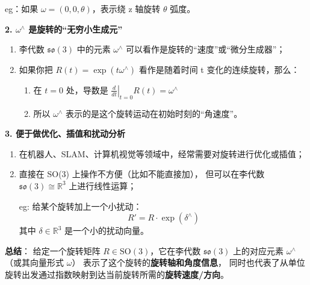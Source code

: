 \documentclass{article}
\begin{document}
eg：如果 $ \omega = (0, 0, \theta) $，表示绕 z 轴旋转 $ \theta $ 弧度。

\textbf{2. $\omega^\wedge$ 是旋转的“无穷小生成元”}
\begin{enumerate}
\item 李代数 $ \mathfrak{so}(3) $ 中的元素 $ \omega^\wedge $ 可以看作是旋转的“速度”或“微分生成器”；
\item 如果你把 $ R(t) = \exp(t\omega^\wedge) $ 看作是随着时间 t 变化的连续旋转，那么：
  \begin{enumerate}
    \item 在 $ t=0 $ 处，导数是 $ \left.\frac{d}{dt}\right|_{t=0} R(t) = \omega^\wedge $
    \item 所以 $ \omega^\wedge $ 表示的是这个旋转运动在初始时刻的“角速度”。
  \end{enumerate}
\end{enumerate}

\textbf{3. 便于做优化、插值和扰动分析}
\begin{enumerate}
\item 在机器人、SLAM、计算机视觉等领域中，经常需要对旋转进行优化或插值；
\item 直接在 SO(3) 上操作不方便（比如不能直接加），
  但可以在李代数 $ \mathfrak{so}(3) \cong \mathbb{R}^3 $ 上进行线性运算；

 eg: 给某个旋转加上一个小扰动：
  $$
  R' = R \cdot \exp(\delta^\wedge)
  $$
  其中 $ \delta \in \mathbb{R}^3 $ 是一个小的扰动向量。

\end{enumerate}

\textbf{总结}：
 给定一个旋转矩阵 $ R \in \text{SO}(3) $，它在李代数 $ \mathfrak{so}(3) $
 上的对应元素 $ \omega^\wedge $（或其向量形式 $ \omega $）
 表示了这个旋转的\textbf{旋转轴和角度信息}，
 同时也代表了从单位旋转出发通过指数映射到达当前旋转所需的\textbf{旋转速度/方向}。
\end{document}
